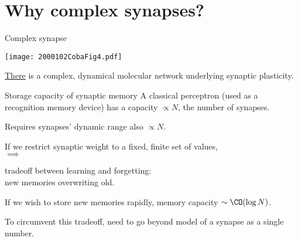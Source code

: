 \documentclass{beamer}%
\begin{document}

\section{Why complex synapses?}


\begin{frame}[label=fr_net]{Complex synapse}
%
 \begin{center}
 \texttt{[image: 2000102CobaFig4.pdf]}
 \end{center}
 \hyperlink{fr_questions}{There} is a complex, dynamical molecular network underlying synaptic plasticity.
%
\end{frame}


\begin{frame}{Storage capacity of synaptic memory}
%
  A classical perceptron (used as a recognition memory device) has a capacity $\propto N$, the number of synapses.

 \vp Requires synapses' dynamic range also $\propto N$.

 \vp If we restrict synaptic weight to a fixed, finite set of values,\\
 \hp $\implies$ \parbox[t]{8cm}{tradeoff between learning and forgetting:\\
 new memories overwriting old.}

 \vp If we wish to store new memories rapidly, memory capacity  $\sim\CO(\log N)$.
 \\ 

 \vp To circumvent this tradeoff, need to go beyond model of a synapse as a single number.
%
\end{frame}

\end{document}
